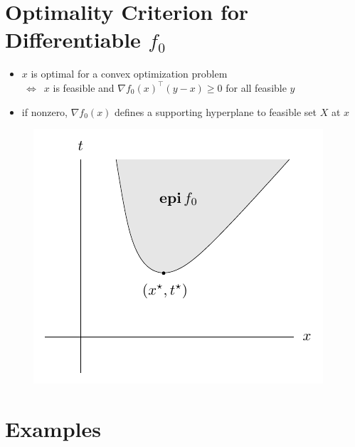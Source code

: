 \documentclass[11pt]{extarticle}
\newcommand{\ds}{\displaystyle}
\newcommand{\ifff}{\,\Longleftrightarrow\,}
\theoremstyle{definition}
\begin{document}
\newpage

\section*{Optimality Criterion for Differentiable $f_0$}
\begin{itemize}
  \item $x$ is optimal for a convex optimization problem \\ $\ifff$ $x$ is feasible and $\ds\nabla f_0(x)^\top(y - x)\geqslant 0$ for all feasible $y$
  \item if nonzero, $\ds\nabla f_0(x)$ defines a supporting hyperplane to feasible set $X$ at $x$
\end{itemize}
\begin{figure}[!htbp]
  \centering
  \includegraphics[scale=1,page=2]{fig/04.pdf}
\end{figure}

\newpage

\section*{Examples}
\end{document}
